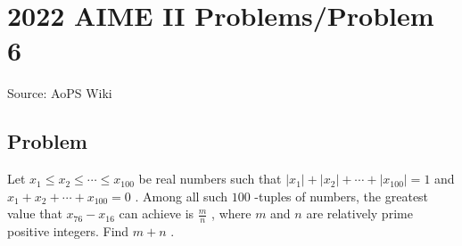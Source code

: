 \documentclass[12pt]{article}
\begin{document}
\section*{{2022 AIME II Problems/Problem 6}}
Source: AoPS Wiki

\subsection*{Problem}
Let $x_1\leq x_2\leq \cdots\leq x_{100}$ be real numbers such that $|x_1| + |x_2| + \cdots + |x_{100}| = 1$ and $x_1 + x_2 + \cdots + x_{100} = 0$ . Among all such $100$ -tuples of numbers, the greatest value that $x_{76} - x_{16}$ can achieve is $\tfrac mn$ , where $m$ and $n$ are relatively prime positive integers. Find $m+n$ .
\end{document}
